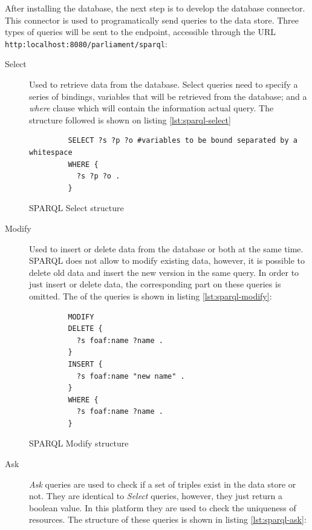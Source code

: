 After installing the database, the next step is to develop the database connector. This connector is used to programatically send queries to the data store. Three types of queries will be sent to the endpoint, accessible through the URL \texttt{http:localhost:8080/parliament/sparql}:

\begin{description}
\item[Select] Used to retrieve data from the database. Select queries need to specify a series of bindings, variables that will be retrieved from the database; and a \textit{where} clause which will contain the information actual query. The structure followed is shown on listing \ref{lst:sparql-select}

\begin{listing}[ht]\centering
  \begin{minipage}{.6\textwidth}
    \begin{verbatim}
	     SELECT ?s ?p ?o #variables to be bound separated by a whitespace
	     WHERE {
	       ?s ?p ?o . 
	     }
    \end{verbatim}
  \end{minipage}
  \caption{SPARQL Select structure}\label{lst:sparql-select}
\end{listing}

\item[Modify] Used to insert or delete data from the database or both at the same time. SPARQL does not allow to modify existing data, however, it is possible to delete old data and insert the new version in the same query. In order to just insert or delete data, the corresponding part on these queries is omitted. The of the queries is shown in listing \ref{lst:sparql-modify}:

\begin{listing}[ht]\centering
  \begin{minipage}{.6\textwidth}
    \begin{verbatim}
	     MODIFY
	     DELETE {
	       ?s foaf:name ?name . 
	     }
	     INSERT {
	       ?s foaf:name "new name" . 
	     }
	     WHERE {
	       ?s foaf:name ?name . 
	     }
    \end{verbatim}
  \end{minipage}
  \caption{SPARQL Modify structure}\label{lst:sparql-modify}
\end{listing}
 
\item[Ask] \textit{Ask} queries are used to check if a set of triples exist in the data store or not. They are identical to \textit{Select} queries, however, they just return a boolean value. In this platform they are used to check the uniqueness of resources. The structure of these queries is shown in listing \ref{lst:sparql-ask}:


\end{description}
